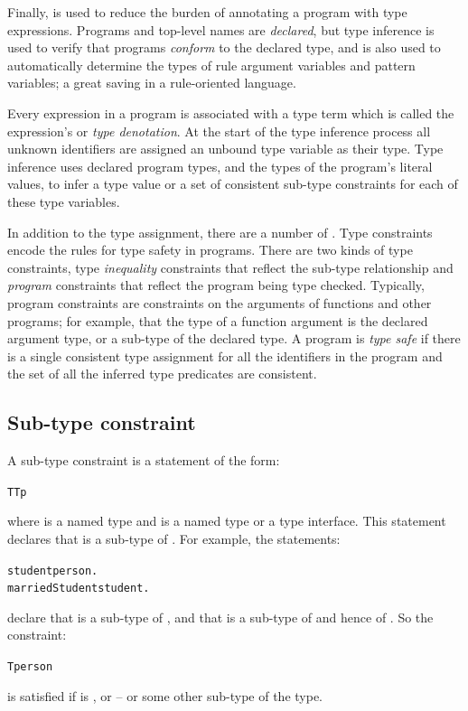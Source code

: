 Finally,  is used to reduce the burden of annotating a program with type expressions. Programs and top-level names are \emph{declared}, but type inference is used to verify that programs \emph{conform} to the declared type, and is also used to automatically determine the types of rule argument variables and pattern variables; a great saving in a rule-oriented language.

Every expression in a \go program is associated with a type term which is called the expression's  or \emph{type denotation}. At the start of the type inference process all unknown identifiers are assigned an unbound type variable as their type.  Type inference uses declared program types, and the types of the program's literal values, to infer a type value or  a set of consistent sub-type constraints for each of these type variables. 

In addition to the type assignment, there are a number of . Type constraints encode the rules for type safety in programs. There are two kinds of type constraints, type \emph{inequality} constraints that reflect the sub-type relationship and \emph{program} constraints that reflect the program being type checked.
Typically, program constraints are constraints on the arguments of functions and other programs; for example, that the type of a function argument is the declared argument type, or a sub-type of the declared type. A program is \emph{type safe} if there is a single consistent type assignment for all the identifiers in the program and the set of all the inferred type predicates are consistent.

\subsection{Sub-type constraint}
\label{type:subtype}
A sub-type constraint is a statement of the form:
\begin{alltt}
T \impl Tp
\end{alltt}
where  is a named type and  is a named type or a type interface. This statement declares that  is a sub-type of . For example, the statements:
\begin{alltt}
student \impl person.
marriedStudent \impl student.
\end{alltt}
declare that  is a sub-type of , and that  is a sub-type of  and hence of . So the constraint:
\begin{alltt}
T \impl person
\end{alltt}
is satisfied if  is ,  or  -- or some other sub-type of the  type.

